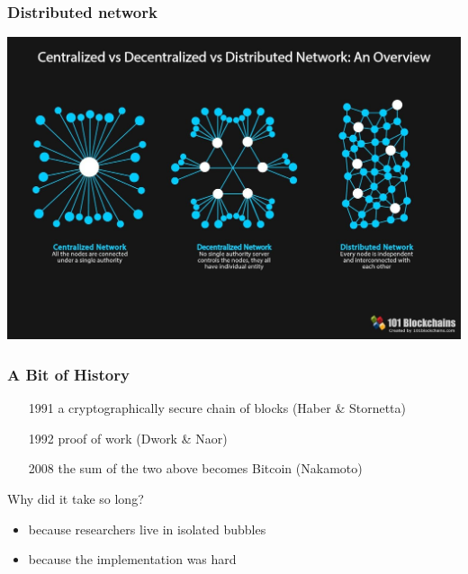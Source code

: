 \documentclass[11pt]{beamer}  %
\begin{document}
\begin{frame}
\end{frame}

\begin{frame}\frametitle{Distributed network}

  \begin{center}
    \includegraphics[scale=0.22,clip=false]{pictures/distributed.jpg}
  \end{center}

\end{frame}

\begin{frame}\frametitle{A Bit of History}

  \begin{itemize}
  \item[1991] a cryptographically secure chain of blocks (Haber \& Stornetta)
  \item[1992] proof of work (Dwork \& Naor)
  \item[2008] the sum of the two above becomes Bitcoin (Nakamoto)
  \end{itemize}

  \bigskip

  \begin{greenbox}{Why did it take so long?}
    \begin{itemize}
    \item because researchers live in isolated bubbles
    \item because the implementation was hard
    \end{itemize}
  \end{greenbox}

\end{frame}
\end{document}
